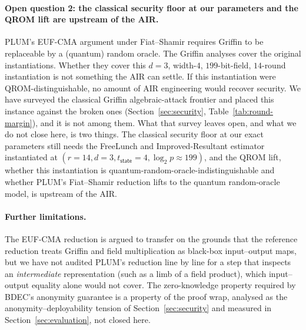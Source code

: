\paragraph{Open question 2: the classical security floor at our parameters and the QROM lift are upstream of the AIR.}
PLUM's EUF-CMA argument under Fiat--Shamir requires Griffin to be replaceable by a (quantum) random oracle. The Griffin analyses cover the original instantiations. Whether they cover this $d=3$, width-$4$, $199$-bit-field, $14$-round instantiation is not something the AIR can settle. If this instantiation were QROM-distinguishable, no amount of AIR engineering would recover security. We have surveyed the classical Griffin algebraic-attack frontier and placed this instance against the broken ones (Section~\ref{sec:security}, Table~\ref{tab:round-margin}), and it is not among them. What that survey leaves open, and what we do not close here, is two things. The classical security floor at our exact parameters still needs the FreeLunch and Improved-Resultant estimator instantiated at $(r{=}14,d{=}3,t_{\mathsf{state}}{=}4,\log_2 p\approx199)$, and the QROM lift, whether this instantiation is quantum-random-oracle-indistinguishable and whether PLUM's Fiat--Shamir reduction lifts to the quantum random-oracle model, is upstream of the AIR.

\paragraph{Further limitations.}
The EUF-CMA reduction is argued to transfer on the grounds that the reference reduction treats Griffin and field multiplication as black-box input--output maps, but we have not audited PLUM's reduction line by line for a step that inspects an \emph{intermediate} representation (such as a limb of a field product), which input--output equality alone would not cover. The zero-knowledge property required by BDEC's anonymity guarantee is a property of the proof wrap, analysed as the anonymity--deployability tension of Section~\ref{sec:security} and measured in Section~\ref{sec:evaluation}, not closed here.

